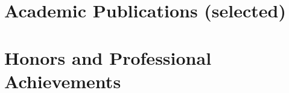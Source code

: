 \documentclass[letterpaper, 11pt]{article}
\renewenvironment{itemize}{
  \begin{list}{}{
    \setlength{\leftmargin}{0.45cm}
  }
}{
  \end{list}
}
\begin{document}
\section*{Academic Publications {\small (selected)}}

\nocite{yon2019exponential,VegaYon2019c,VegaYon2019a,VegaYon2019b,vegayon2020aphylo}

\printbibliography[title=\vskip-20pt,omitnumbers=true]



%

%

\section*{Honors and Professional Achievements}
\end{document}
